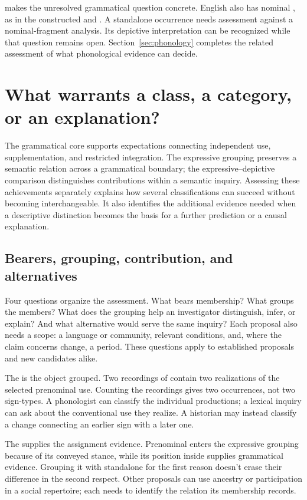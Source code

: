 \documentclass[12pt]{article}
\begin{document}
 makes the unresolved grammatical question concrete.
English also has nominal , as in the constructed
 and . A standalone occurrence
needs assessment against a nominal-fragment analysis.
Its depictive interpretation can be recognized while that question remains
open. Section~\ref{sec:phonology} completes the related assessment of
what phonological evidence can decide.

\section{What warrants a class, a category, or an explanation?}\label{sec:assessment}

The grammatical core supports expectations connecting independent use,
supplementation, and restricted integration. The expressive grouping preserves
a semantic relation across a grammatical boundary; the expressive--depictive
comparison distinguishes contributions within a semantic inquiry. Assessing
these achievements separately explains how several classifications can
succeed without becoming interchangeable. It also identifies the additional
evidence needed when a descriptive distinction becomes the basis for
a further prediction or a causal explanation.

\subsection{Bearers, grouping, contribution, and alternatives}

Four questions organize the assessment. What bears membership? What groups
the members? What does the grouping help an investigator distinguish,
infer, or explain? And what alternative would serve the same inquiry?
Each proposal also needs a scope: a language or community, relevant
conditions, and, where the claim concerns change, a period. These
questions apply to established proposals and new candidates alike.

The  is the object grouped. Two recordings of  contain two realizations of the selected prenominal
 use. Counting the recordings gives two occurrences, not
two sign-types. A phonologist can classify the individual productions;
a lexical inquiry can ask about the conventional use they realize.
A historian may instead classify a change connecting an earlier sign
with a later one.

The  supplies the assignment evidence. Prenominal
 enters the expressive grouping because of its conveyed
stance, while its position inside  supplies
grammatical evidence. Grouping it with standalone  for
the first reason doesn't erase their difference in the second respect.
Other proposals can use ancestry or participation in a social repertoire;
each needs to identify the relation its membership records.
\end{document}
